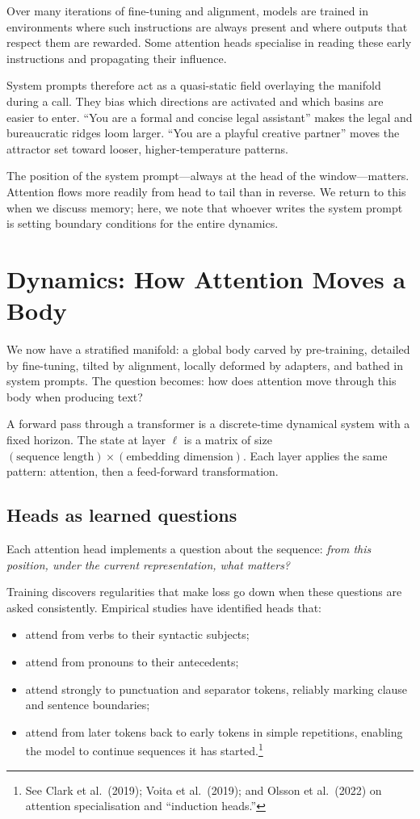 Over many iterations of fine-tuning and alignment, models are trained in environments where such instructions are always present and where outputs that respect them are rewarded. Some attention heads specialise in reading these early instructions and propagating their influence.

System prompts therefore act as a quasi-static field overlaying the manifold during a call. They bias which directions are activated and which basins are easier to enter. ``You are a formal and concise legal assistant'' makes the legal and bureaucratic ridges loom larger. ``You are a playful creative partner'' moves the attractor set toward looser, higher-temperature patterns.

The position of the system prompt---always at the head of the window---matters. Attention flows more readily from head to tail than in reverse. We return to this when we discuss memory; here, we note that whoever writes the system prompt is setting boundary conditions for the entire dynamics.

\section{Dynamics: How Attention Moves a Body}

We now have a stratified manifold: a global body carved by pre-training, detailed by fine-tuning, tilted by alignment, locally deformed by adapters, and bathed in system prompts. The question becomes: how does attention move through this body when producing text?

A forward pass through a transformer is a discrete-time dynamical system with a fixed horizon. The state at layer $\ell$ is a matrix of size $(\text{sequence length}) \times (\text{embedding dimension})$. Each layer applies the same pattern: attention, then a feed-forward transformation.

\subsection*{Heads as learned questions}

Each attention head implements a question about the sequence: \emph{from this position, under the current representation, what matters?}

Training discovers regularities that make loss go down when these questions are asked consistently. Empirical studies have identified heads that:

\begin{itemize}
  \item attend from verbs to their syntactic subjects;
  \item attend from pronouns to their antecedents;
  \item attend strongly to punctuation and separator tokens, reliably marking clause and sentence boundaries;
  \item attend from later tokens back to early tokens in simple repetitions, enabling the model to continue sequences it has started.\footnote{See Clark et al.\ (2019); Voita et al.\ (2019); and Olsson et al.\ (2022) on attention specialisation and ``induction heads.''}
\end{itemize}

